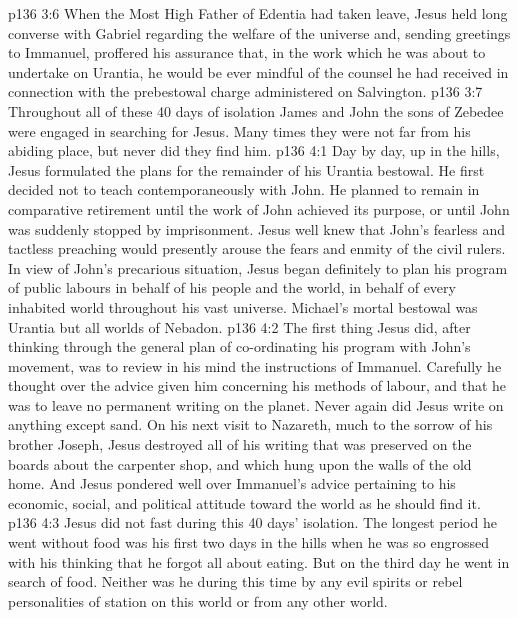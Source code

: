 \vs p136 3:6 When the Most High Father of Edentia had taken leave, Jesus held long converse with Gabriel regarding the welfare of the universe and, sending greetings to Immanuel, proffered his assurance that, in the work which he was about to undertake on Urantia, he would be ever mindful of the counsel he had received in connection with the prebestowal charge administered on Salvington.
\vs p136 3:7 \pc Throughout all of these 40 days of isolation James and John the sons of Zebedee were engaged in searching for Jesus. Many times they were not far from his abiding place, but never did they find him.
\vs p136 4:1 Day by day, up in the hills, Jesus formulated the plans for the remainder of his Urantia bestowal. He first decided not to teach contemporaneously with John. He planned to remain in comparative retirement until the work of John achieved its purpose, or until John was suddenly stopped by imprisonment. Jesus well knew that John’s fearless and tactless preaching would presently arouse the fears and enmity of the civil rulers. In view of John’s precarious situation, Jesus began definitely to plan his program of public labours in behalf of his people and the world, in behalf of every inhabited world throughout his vast universe. Michael’s mortal bestowal was  Urantia but  all worlds of Nebadon.
\vs p136 4:2 The first thing Jesus did, after thinking through the general plan of co\hyp{}ordinating his program with John’s movement, was to review in his mind the instructions of Immanuel. Carefully he thought over the advice given him concerning his methods of labour, and that he was to leave no permanent writing on the planet. Never again did Jesus write on anything except sand. On his next visit to Nazareth, much to the sorrow of his brother Joseph, Jesus destroyed all of his writing that was preserved on the boards about the carpenter shop, and which hung upon the walls of the old home. And Jesus pondered well over Immanuel’s advice pertaining to his economic, social, and political attitude toward the world as he should find it.
\vs p136 4:3 \pc Jesus did not fast during this 40 days’ isolation. The longest period he went without food was his first two days in the hills when he was so engrossed with his thinking that he forgot all about eating. But on the third day he went in search of food. Neither was he  during this time by any evil spirits or rebel personalities of station on this world or from any other world.
